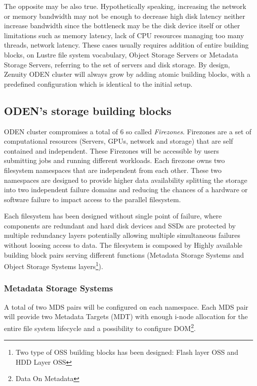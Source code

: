 \documentclass{article}
\begin{document}
The opposite may be also true. Hypothetically speaking, increasing the network or memory bandwidth may not be enough to decrease high disk latency neither increase bandwidth since the bottleneck may be the disk device itself or other limitations such as memory latency, lack of CPU resources managing too many threads, network latency.
These cases usually requires addition of entire building blocks, on Lustre file system vocabulary, Object Storage Servers or Metadata Storage Servers, referring to the set of servers and disk storage. 
By design, Zenuity ODEN cluster will always grow by adding atomic building blocks, with a predefined configuration which is identical to the initial setup.

\subsection{ODEN's storage building blocks}
ODEN cluster compromises a total of 6 so called \textit{Firezones}. Firezones are a set of computational resources (Servers, GPUs, network and storage) that are self contained and independent. These Firezones will be accessible by users submitting jobs and running different workloads. Each firezone owns two filesystem namespaces that are independent from each other. These two namespaces are designed to provide higher data availability splitting the storage into two independent failure domains and reducing the chances of a hardware or software failure to impact access to the parallel filesystem.

Each filesystem has been designed without single point of failure, where components are redundant and hard disk devices and SSDs are protected by multiple redundancy layers potentially allowing multiple simultaneous failures without loosing access to data. The filesystem is composed by Highly available building block pairs serving different functions (Metadata Storage Systems and Object Storage Systems layers\footnote{Two type of OSS building blocks has been designed: Flash layer OSS and HDD Layer OSS}).


\subsubsection{Metadata Storage Systems}
A total of two MDS pairs will be configured on each namespace. Each MDS pair will provide two Metadata Targets (MDT) with enough i-node allocation for the entire file system lifecycle and a possibility to configure DOM\footnote{Data On Metadata}. 
\end{document}
